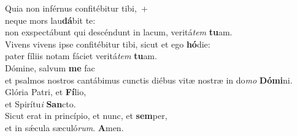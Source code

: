 \oddverse Quia non inférnus confitébitur tibi,~+\\
\oddverse  neque mors lau\textbf{dá}bit te:~\*\\
\oddverse non exspectábunt qui descéndunt in lacum, veritá\textit{tem} \textbf{tu}am.\\
\evenverse Vivens vivens ipse confitébitur tibi, sicut et ego \textbf{hó}die:~\*\\
\evenverse pater fíliis notam fáciet veritá\textit{tem} \textbf{tu}am.\\
\oddverse Dómine, salvum \textbf{me} fac~\*\\
\oddverse et psalmos nostros cantábimus cunctis diébus vitæ nostræ in do\textit{mo} \textbf{Dó}\textbf{mi}ni.\\
\evenverse Glória Patri, et \textbf{Fí}lio,~\*\\
\evenverse et Spirítu\textit{i} \textbf{San}cto.\\
\oddverse Sicut erat in princípio, et nunc, et \textbf{sem}per,~\*\\
\oddverse et in sǽcula sæculó\textit{rum}. \textbf{A}men.\\
